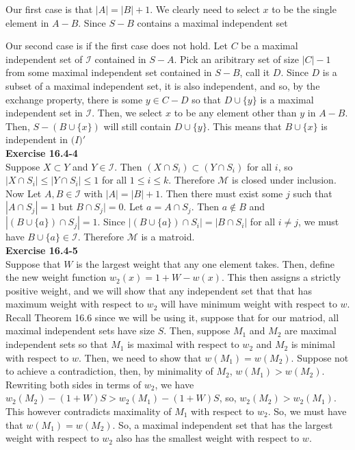 \documentclass{article}
\begin{document}
Our first case is that $|A| = |B|+1$. We clearly need to select $x$ to be the single element in $A-B$. Since $S-B$ contains a maximal independent set

Our second case is if the first case does not hold. Let $C$ be a maximal independent set of $\mathcal{I}$ contained in $S-A$. Pick an aribitrary set of size $|C|-1$ from some maximal independent set contained in $S-B$, call it $D$. Since $D$ is a subset of a maximal independent set, it is also independent, and so, by the exchange property, there is some $y\in C-D$ so that $D\cup\{y\}$ is a maximal independent set in $\mathcal{I}$. Then, we select $x$ to be any element other than $y$ in $A-B$. Then, $S - (B\cup\{x\})$ will still contain $D\cup\{y\}$. This means that $B\cup \{x\}$ is independent in $\mathcal(I)'$\\

\noindent\textbf{Exercise 16.4-4}\\

Suppose $X \subset Y$ and $Y \in \mathcal{I}$.  Then $(X \cap S_i) \subset (Y \cap S_i)$ for all $i$, so $|X \cap S_i| \leq |Y \cap S_i| \leq 1$ for all $1 \leq i \leq k$. Therefore $\mathcal{M}$ is closed under inclusion.\\ 

Now Let $A, B \in \mathcal{I}$ with $|A| = |B| + 1$.  Then there must exist some $j$ such that $|A \cap S_j| = 1$ but $B \cap S_j| = 0$.  Let $a = A \cap S_j$.  Then $a \notin B$ and $|(B \cup \{a\}) \cap S_j| = 1$.  Since $|(B \cup \{a\}) \cap S_i| = |B \cap S_i|$ for all $i \neq j$, we must have $B \cup \{a\} \in \mathcal{I}$.  Therefore $\mathcal{M}$ is a matroid.\\

\noindent\textbf{Exercise 16.4-5}\\

Suppose that $W$ is the largest weight that any one element takes. Then, define the new weight function $w_2(x) = 1+ W - w(x)$. This then assigns a strictly positive weight, and we will show that any independent set that that has maximum weight with respect to $w_2$ will have minimum weight with respect to $w$. Recall Theorem 16.6 since we will be using it, suppose that for our matriod, all maximal independent sets have size $S$. Then, suppose $M_1$ and $M_2$ are maximal independent sets so that $M_1$ is maximal with respect to $w_2$ and $M_2$ is minimal with respect to $w$. Then, we need to show that $w(M_1) = w(M_2)$. Suppose not to achieve a contradiction, then, by minimality of $M_2$, $w(M_1) > w (M_2)$. Rewriting both sides in terms of $w_2$, we have $w_2(M_2) - (1+W)S > w_2(M_1) - (1+W)S$, so, $w_2(M_2) > w_2(M_1)$. This however contradicts maximality of $M_1$ with respect to $w_2$. So, we must have that $w(M_1) = w(M_2)$. So, a maximal independent set that has the largest weight with respect to $w_2$ also has the smallest weight with respect to $w$.
\end{document}
